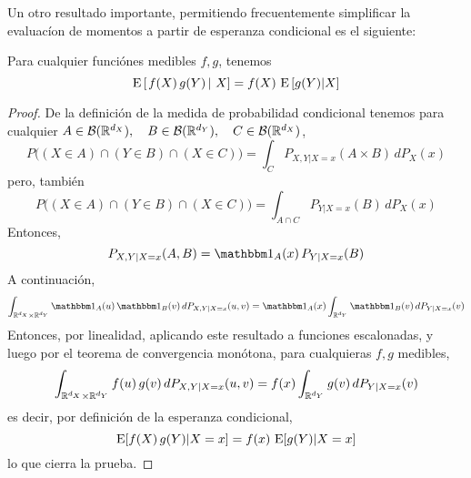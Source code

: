 Un  otro   resultado  importante,  permitiendo   frecuentemente  simplificar  la
evaluac\'ion de momentos a partir de esperanza condicional es el siguiente:
%
\begin{teorema}\label{Teo:MP:EsperanzaCondicionalFXY}
%
  Para cualquier funci\'ones medibles $f, g$, tenemos
  \[
  \operatorname{E}\left[ \left.  f(X) \, g(Y) \, \right|  \, X \right] =  f(X) \, \operatorname{E}\left[
    g(Y) | X\right]
  \]
\end{teorema}
%
\begin{proof}
  De  la definici\'on  de la  medida  de probabilidad  condicional tenemos  para
  cualquier $A  \in \mathcal{B}(\mathbb{R}^{d_X}),  \quad B \in  \mathcal{B}(\mathbb{R}^{d_Y}), \quad  C \in
  \mathcal{B}(\mathbb{R}^{d_X})$,
  \[
  P\big( (X \in  A) \cap (Y \in B)  \cap (X \in C) \big)  = \int_C P_{X,Y|X=x}(A
  \times B) \, dP_X(x)
  \]
  pero, tambi\'en
  \[
  P\big(  (X \in  A) \cap  (Y \in  B) \cap  (X \in  C) \big)  = \int_{A  \cap C}
  P_{Y|X=x}(B) \, dP_X(x)
  \]
  Entonces,
  \[
  P_{X,Y|X=x}(A,B) = \un_A(x) \, P_{Y|X=x}(B)
  \]
  A continuaci\'on,
  \[
  \int_{\Rset^{d_X}    \times    \Rset^{d_Y}}    \un_A(u)   \,    \un_B(v)    \,
  dP_{X,Y|X=x}(u,v) = \un_A(x) \int_{\Rset^{d_Y}} \un_B(v) \, dP_{Y|X=x}(v)
  \]
  Entonces, por linealidad, aplicando  este resultado a funciones escalonadas, y
  luego  por el  teorema de  convergencia  mon\'otona, para  cualquieras $f,  g$
  medibles,
  \[
  \int_{\mathbb{R}^{d_X}  \times \mathbb{R}^{d_Y}}  f(u) \, g(v)  \, dP_{X,Y|X=x}(u,v) =
  f(x) \int_{\mathbb{R}^{d_Y}} g(v) \, dP_{Y|X=x}(v)
  \]
  es decir, por definici\'on de la esperanza condicional,
  \[
  \operatorname{E}[ f(X) \, g(Y) | X = x] = f(x) \, \operatorname{E}[g(Y) | X=x]
  \]
  lo que cierra la prueba.
\end{proof}

